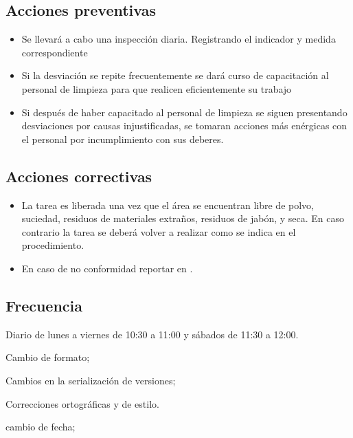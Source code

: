\subsection{Acciones preventivas}

\begin{itemize}
	\item Se llevará a cabo una inspección diaria. Registrando el indicador y medida correspondiente
	\item Si la desviación se repite frecuentemente se dará curso de capacitación al personal de limpieza para que realicen eficientemente su trabajo
	\item Si después de haber capacitado al personal de limpieza se siguen presentando desviaciones por causas injustificadas, se tomaran acciones más enérgicas con el personal por incumplimiento con sus deberes.
\end{itemize}

\subsection{Acciones correctivas}

\begin{itemize}
	\item La tarea es liberada una vez que el área se encuentran libre de polvo, suciedad, residuos de materiales extraños, residuos de jabón, y seca. En caso contrario la tarea se deberá volver a realizar como se indica en el procedimiento.
	\item En caso de no conformidad reportar en \RAC.
\end{itemize}

\subsection{Frecuencia}

Diario de lunes a viernes de 10:30 a 11:00 y sábados de 11:30 a 12:00.

\begin{changelog}[title=Registro de cambios,simple, sectioncmd=\subsection*,label=changelog-\thesection-\MayorVer.\MenorVer6]
	\begin{version}[v=\MayorVer.\MenorVer, date=2023--01, author=Pablo E. Alanis]
		\item Cambio de formato;
		\item Cambios en la serialización de versiones;
		\item Correcciones ortográficas y de estilo.
	\end{version}

	\begin{version}[v=1.7, date=2022--05, author=Alonso M.]
		\item cambio de fecha;
	\end{version}	

\end{changelog}